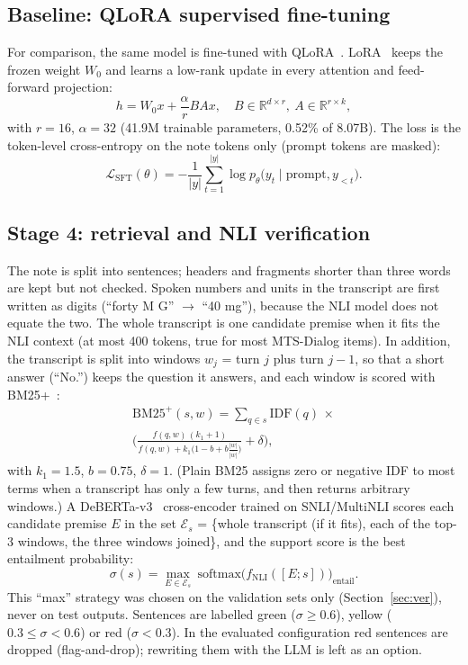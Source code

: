 \documentclass[conference]{IEEEtran}
\begin{document}
\subsection{Baseline: QLoRA supervised fine-tuning}
For comparison, the same model is fine-tuned with QLoRA~\cite{dettmers2023qlora}. LoRA~\cite{hu2022lora}
keeps the frozen weight $W_0$ and learns a low-rank update in every attention and feed-forward projection:
\begin{equation}
h = W_0 x + \frac{\alpha}{r} B A x,\quad B\in\mathbb{R}^{d\times r},\ A\in\mathbb{R}^{r\times k},
\end{equation}
with $r=16$, $\alpha=32$ (41.9M trainable parameters, 0.52\% of 8.07B). The loss is the token-level
cross-entropy on the note tokens only (prompt tokens are masked):
\begin{equation}
\mathcal{L}_{\text{SFT}}(\theta) = -\frac{1}{|y|}\sum_{t=1}^{|y|} \log p_\theta\big(y_t \mid \text{prompt}, y_{<t}\big).
\end{equation}

\subsection{Stage 4: retrieval and NLI verification}
The note is split into sentences; headers and fragments shorter than three words are kept but not checked.
Spoken numbers and units in the transcript are first written as digits (``forty M G'' $\rightarrow$
``40 mg''), because the NLI model does not equate the two. The whole transcript is one candidate premise when it fits the NLI
context (at most 400 tokens, true for most MTS-Dialog items). In addition, the transcript is split into windows $w_j$ = turn $j$ plus turn $j{-}1$, so that a short answer (``No.'')
keeps the question it answers, and each window is scored with BM25+~\cite{lv2011bm25plus}:
\begin{multline}
\mathrm{BM25^{+}}(s, w) = \sum_{q\in s} \mathrm{IDF}(q)\,\times\\
\Big(\frac{f(q,w)\,(k_1+1)}{f(q,w) + k_1\big(1-b+b\frac{|w|}{\overline{|w|}}\big)}+\delta\Big),
\end{multline}
with $k_1=1.5$, $b=0.75$, $\delta=1$. (Plain BM25 assigns zero or negative IDF to most terms when a
transcript has only a few turns, and then returns arbitrary windows.) A DeBERTa-v3~\cite{he2023debertav3}
cross-encoder trained on SNLI/MultiNLI scores each candidate premise $E$ in the set
$\mathcal{E}_s$ = \{whole transcript (if it fits), each of the top-3 windows, the three windows joined\}, and
the support score is the best entailment probability:
\begin{equation}
\sigma(s) = \max_{E\in\mathcal{E}_s}\ \mathrm{softmax}\big(f_{\text{NLI}}([E; s])\big)_{\text{entail}}.
\end{equation}
This ``max'' strategy was chosen on the validation sets only (Section~\ref{sec:ver}), never on test outputs.
Sentences are labelled green ($\sigma\ge0.6$), yellow ($0.3\le\sigma<0.6$) or red ($\sigma<0.3$). In the
evaluated configuration red sentences are dropped (flag-and-drop); rewriting them with the LLM is left as
an option.
\end{document}
